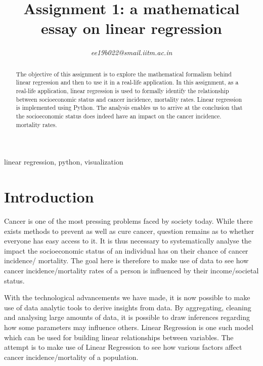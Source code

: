 \documentclass[conference]{IEEEtran}
\begin{document}
\title{Assignment 1: a mathematical essay on linear regression\\}


\author{
\textit{ee19b022@smail.iitm.ac.in}

}

\maketitle

\begin{abstract}
The objective of this assignment is to explore the mathematical formalism behind linear regression and then to use it in a real-life application. In this assignment, as a real-life application, linear regression is used to formally identify the relationship between socioeconomic status and cancer incidence, mortality rates. Linear regression is implemented using Python. The analysis enables us to arrive at the conclusion that the socioeconomic status does indeed have an impact on the cancer incidence. mortality rates. 
\end{abstract}

\begin{IEEEkeywords}
linear regression, python, visualization
\end{IEEEkeywords}

\section{Introduction}

Cancer is one of the most pressing problems faced by society today. While there exists methods to prevent as well as cure cancer, question remains as to whether everyone has easy access to it. It is thus necessary to systematically analyse the impact the socioeconomic status of an individual has on their chance of cancer incidence/ mortality. The goal here is therefore to make use of data to see how cancer incidence/mortality rates of a person is influenced by their income/societal status. 

With the technological advancements we have made, it is now possible to make use of data analytic tools to derive insights from data. By aggregating, cleaning and analysing large amounts of data, it is possible to draw inferences regarding how some parameters may influence others. Linear Regression is one such model which can be used for building linear relationships between variables. The attempt is to make use of Linear Regression to see how various factors affect cancer incidence/mortality of a population.
\end{document}
